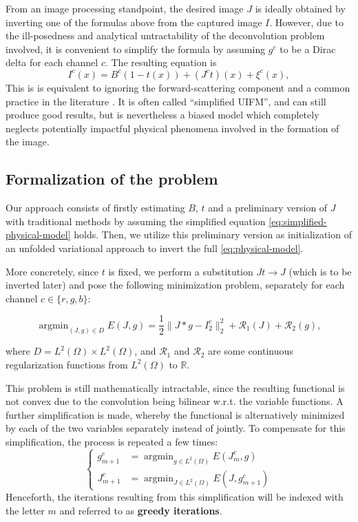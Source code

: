 \documentclass[twocolumn,twoside,a4paper,10pt]{IEEEtran}
\DeclareMathOperator*{\argmin}{\operatorname*{argmin}}
\DeclareMathOperator*{\argmin}{arg\,min}
\begin{document}
From an image processing standpoint, the desired image \(J\) is ideally obtained by inverting one of the formulas above from the captured image \(I\). However, due to the ill-posedness and analytical untractability of the deconvolution problem involved, it is convenient to simplify the formula by assuming \(g^c\) to be a Dirac delta for each channel \(c\). The resulting equation is
\begin{equation}\label{eq:simplified-physical-model}
  I^c(x) = B^c\left(1 - t(x)\right) + \left(J^c t\right) (x) + \xi^c(x),
\end{equation}
This is is equivalent to ignoring the forward-scattering component and a common practice in the literature \cite{ancuti2017color}. It is often called ``simplified UIFM'', and can still produce good results, but is nevertheless a biased model which completely neglects potentially impactful physical phenomena involved in the formation of the image.

\subsection{Formalization of the problem}
Our approach consists of firstly estimating \(B\), \(t\) and a preliminary version of \(J\) with traditional methods by assuming the simplified equation \cref{eq:simplified-physical-model} holds. Then, we utilize this preliminary version as initialization of an unfolded variational approach to invert the full \cref{eq:physical-model}.

More concretely, since \(t\) is fixed, we perform a substitution \(Jt\to J\) (which is to be inverted later) and pose the following minimization problem, separately for each channel \(c\in\{r, g, b\}\):

\begin{equation}\label{eq:full-I2-functional}
  \argmin_{(J, g)\in D} E(J, g) = \frac12\|J\ast g - I_2^c\|_2^2 + \mathcal{R}_1(J) + \mathcal{R}_2(g),
\end{equation}

where \(D = L^2(\Omega)\times L^2(\Omega)\), and \(\mathcal{R}_1\) and \(\mathcal{R}_2\) are some continuous regularization functions from \(L^2(\Omega)\) to \(\mathbb{R}\). 

This problem is still mathematically intractable, since the resulting functional is not convex due to the convolution being bilinear w.r.t. the variable functions. A further simplification is made, whereby the functional is alternatively minimized by each of the two variables separately instead of jointly. To compensate for this simplification, the process is repeated a few times:
\begin{equation}\label{eq:greedy-iterations}
  \left\{\begin{split}
    g_{m+1}^c &= \argmin_{g\in L^2(\Omega)} E(J_m^c, g) \\
    J_{m+1}^c &= \argmin_{J\in L^2(\Omega)} E(J, g_{m+1}^c)
  \end{split}\right.
\end{equation}
Henceforth, the iterations resulting from this simplification will be indexed with the letter \(m\) and referred to as \textbf{greedy iterations}.
\end{document}
